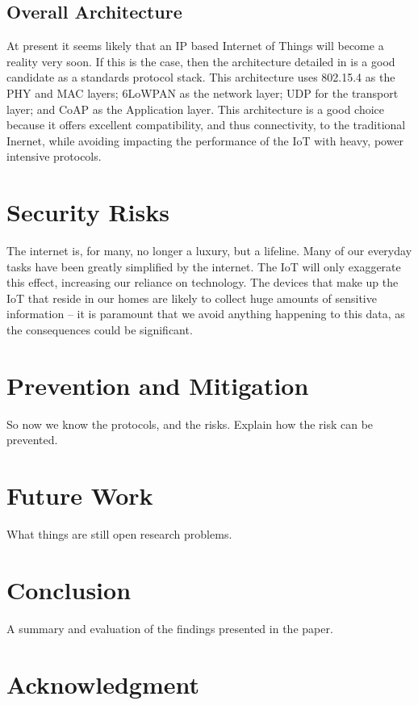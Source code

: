\documentclass[journal]{IEEEtran}
\begin{document}
\subsection{Overall Architecture}
At present it seems likely that an IP based Internet of Things will become a
reality very soon. If this is the case, then the architecture detailed in
\cite{Palattella2013} is a good candidate as a standards protocol stack. This
architecture uses 802.15.4 as the PHY and MAC layers; 6LoWPAN as the network
layer; UDP for the transport layer; and CoAP as the Application layer. This
architecture is a good choice because it offers excellent compatibility, and
thus connectivity, to the traditional Inernet, while avoiding impacting the
performance of the IoT with heavy, power intensive protocols. 

\section{Security Risks}
The internet is, for many, no longer a luxury, but a lifeline. Many of our
everyday tasks have been greatly simplified by the internet. The IoT will only
exaggerate this effect, increasing our reliance on technology. The devices that
make up the IoT that reside in our homes are likely to collect huge amounts of
sensitive information -- it is paramount that we avoid anything happening to
this data, as the consequences could be significant. 


\section{Prevention and Mitigation}
So now we know the protocols, and the risks. Explain how the risk can be
prevented.


\section{Future Work}
What things are still open research problems. 


\section{Conclusion}
A summary and evaluation of the findings presented in the paper.



\section*{Acknowledgment}
\end{document}
